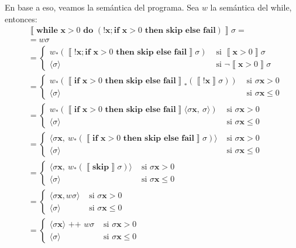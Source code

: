 \documentclass{article}
\newcommand{\sem}[1]{\left\llbracket #1\right\rrbracket}
\newcommand{\x}{\textbf{x}}
\newcommand{\concat}{\texttt{ ++ }}
\newcommand{\cskip}{\textbf{skip}}
\newcommand{\cif}[3]{\textbf{if }#1\textbf{ then }#2\textbf{ else }#3}
\newcommand{\cwhile}[2]{\textbf{while }#1\textbf{ do }#2}
\newcommand{\cfail}{\textbf{fail}}
\newcommand{\cout}[1]{\langle #1\rangle}
\begin{document}
En base a eso, veamos la semántica del programa.
Sea $w$ la semántica del while, entonces:
\begin{equation*}
  \begin{aligned}
    &\sem{\cwhile{\x>0}{(!\x; \cif{\x>0}{\cskip}{\cfail})}} \sigma = \\ 
    &= w\sigma \\ 
    &= \begin{cases}
      w_* (\sem{!\x; \cif{\x>0}{\cskip}{\cfail}}\sigma) &\text{ si }\sem{\x>0}\sigma \\ 
      \cout{\sigma} &\text{ si }\neg\sem{\x>0}\sigma
    \end{cases} \\ 
    &= \begin{cases}
      w_* (\sem{\cif{\x>0}{\cskip}{\cfail}}_* (\sem{!\x}\sigma)) &\text{ si }\sigma\x > 0 \\ 
      \cout{\sigma} &\text{ si }\sigma\x \leq 0
    \end{cases} \\ 
    &= \begin{cases}
      w_* (\sem{\cif{\x>0}{\cskip}{\cfail}} \cout{\sigma\x,\ \sigma}) &\text{ si }\sigma\x > 0 \\ 
      \cout{\sigma} &\text{ si }\sigma\x \leq 0
    \end{cases} \\ 
    &= \begin{cases}
      \cout{\sigma\x,\ w_* (\sem{\cif{\x>0}{\cskip}{\cfail}} \sigma)} &\text{ si }\sigma\x > 0 \\ 
      \cout{\sigma} &\text{ si }\sigma\x \leq 0 
    \end{cases} \\ 
    &= \begin{cases}
      \cout{\sigma\x,\ w_* (\sem{\cskip} \sigma)} &\text{ si }\sigma\x > 0 \\ 
      \cout{\sigma} &\text{ si }\sigma\x \leq 0 
    \end{cases} \\ 
    &= \begin{cases}
      \cout{\sigma\x, w \sigma} &\text{ si } \sigma\x > 0 \\ 
      \cout{\sigma} &\text{ si }\sigma\x \leq 0 
    \end{cases} \\ 
    &= \begin{cases}
      \cout{\sigma\x} \concat w\sigma &\text{ si }\sigma\x > 0 \\ 
      \cout{\sigma} &\text{ si }\sigma\x \leq 0
    \end{cases}
  \end{aligned}
\end{equation*}
\end{document}

